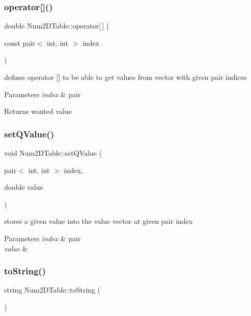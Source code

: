 \subsubsection{\texorpdfstring{operator[]()}{operator[]()}}
{\footnotesize\ttfamily double Num2\+D\+Table\+::operator\mbox{[}$\,$\mbox{]} (\begin{DoxyParamCaption}\item[{const pair$<$ int, int $>$}]{index }\end{DoxyParamCaption})\hspace{0.3cm}{\ttfamily [inline]}}

defines operator \mbox{[}\mbox{]} to be able to get values from vector with given pair indices 
\begin{DoxyParams}{Parameters}
{\em index} & pair \\
\hline
\end{DoxyParams}
\begin{DoxyReturn}{Returns}
wanted value 
\end{DoxyReturn}
\mbox{\label{class_num2_d_table_a218340f919c8382a00a11cf31abbff3e}} 
\subsubsection{\texorpdfstring{set\+Q\+Value()}{setQValue()}}
{\footnotesize\ttfamily void Num2\+D\+Table\+::set\+Q\+Value (\begin{DoxyParamCaption}\item[{pair$<$ int, int $>$}]{index,  }\item[{double}]{value }\end{DoxyParamCaption})\hspace{0.3cm}{\ttfamily [inline]}}

stores a given value into the value vector at given pair index 
\begin{DoxyParams}{Parameters}
{\em index} & pair \\
\hline
{\em value} & \\
\hline
\end{DoxyParams}
\mbox{\label{class_num2_d_table_a09def4905eca445abdccdb76224dcc85}} 
\subsubsection{\texorpdfstring{to\+String()}{toString()}}
{\footnotesize\ttfamily string Num2\+D\+Table\+::to\+String (\begin{DoxyParamCaption}{ }\end{DoxyParamCaption})\hspace{0.3cm}{\ttfamily [inline]}}

